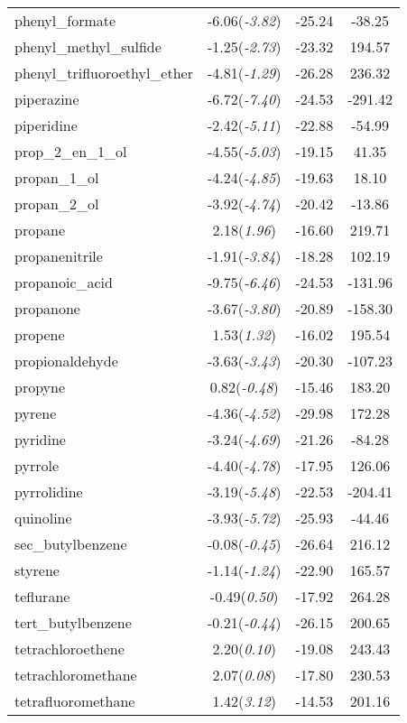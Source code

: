 \documentclass{amsart}
\begin{document}
\begin{center}
\begin{longtable}{l|c|c|c}
phenyl\_formate & -6.06(\textit{-3.82}) & -25.24 & -38.25 \\ 
phenyl\_methyl\_sulfide & -1.25(\textit{-2.73}) & -23.32 & 194.57 \\ 
phenyl\_trifluoroethyl\_ether & -4.81(\textit{-1.29}) & -26.28 & 236.32 \\ 
piperazine & -6.72(\textit{-7.40}) & -24.53 & -291.42 \\ 
piperidine & -2.42(\textit{-5.11}) & -22.88 & -54.99 \\ 
prop\_2\_en\_1\_ol & -4.55(\textit{-5.03}) & -19.15 & 41.35 \\ 
propan\_1\_ol & -4.24(\textit{-4.85}) & -19.63 & 18.10 \\ 
propan\_2\_ol & -3.92(\textit{-4.74}) & -20.42 & -13.86 \\ 
propane & 2.18(\textit{1.96}) & -16.60 & 219.71 \\ 
propanenitrile & -1.91(\textit{-3.84}) & -18.28 & 102.19 \\ 
propanoic\_acid & -9.75(\textit{-6.46}) & -24.53 & -131.96 \\ 
propanone & -3.67(\textit{-3.80}) & -20.89 & -158.30 \\ 
propene & 1.53(\textit{1.32}) & -16.02 & 195.54 \\ 
propionaldehyde & -3.63(\textit{-3.43}) & -20.30 & -107.23 \\ 
propyne & 0.82(\textit{-0.48}) & -15.46 & 183.20 \\ 
pyrene & -4.36(\textit{-4.52}) & -29.98 & 172.28 \\ 
pyridine & -3.24(\textit{-4.69}) & -21.26 & -84.28 \\ 
pyrrole & -4.40(\textit{-4.78}) & -17.95 & 126.06 \\ 
pyrrolidine & -3.19(\textit{-5.48}) & -22.53 & -204.41 \\ 
quinoline & -3.93(\textit{-5.72}) & -25.93 & -44.46 \\ 
sec\_butylbenzene & -0.08(\textit{-0.45}) & -26.64 & 216.12 \\ 
styrene & -1.14(\textit{-1.24}) & -22.90 & 165.57 \\ 
teflurane & -0.49(\textit{0.50}) & -17.92 & 264.28 \\ 
tert\_butylbenzene & -0.21(\textit{-0.44}) & -26.15 & 200.65 \\ 
tetrachloroethene & 2.20(\textit{0.10}) & -19.08 & 243.43 \\ 
tetrachloromethane & 2.07(\textit{0.08}) & -17.80 & 230.53 \\ 
tetrafluoromethane & 1.42(\textit{3.12}) & -14.53 & 201.16 \\ 

\end{longtable}
\end{center}
\end{document}
